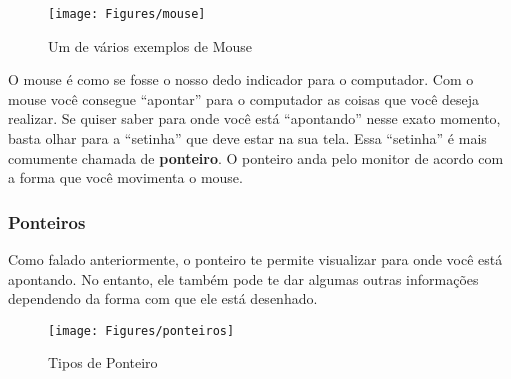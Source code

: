 \documentclass[hidelinks,12pt]{article}
\begin{document}
\begin{figure}[!h]
	\centering
	\texttt{[image: Figures/mouse]}
	\caption{Um de vários exemplos de Mouse}
	\label{fig:mouse}
\end{figure}

O mouse é como se fosse o nosso dedo indicador para o computador. Com o mouse você consegue ``apontar'' para o computador as coisas que você deseja realizar. Se quiser saber para onde você está ``apontando'' nesse exato momento, basta olhar para a ``setinha'' que deve estar na sua tela. Essa ``setinha'' é mais comumente chamada de \textbf{ponteiro}. O ponteiro anda pelo monitor de acordo com a forma que você movimenta o mouse. 

\subsubsection{Ponteiros}

Como falado anteriormente, o ponteiro te permite visualizar para onde você está apontando. No entanto, ele também pode te dar algumas outras informações dependendo da forma com que ele está desenhado.


\begin{figure}[!h]
	\centering
	\texttt{[image: Figures/ponteiros]}
	\caption{Tipos de Ponteiro}
	\label{fig:ponteiros}
\end{figure}
\end{document}
